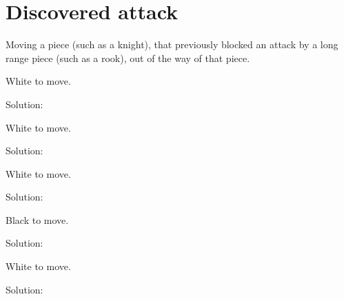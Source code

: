 \documentclass{book}
\begin{document}
\section{Discovered attack}
Moving a piece (such as a knight), that previously blocked an attack by a long range piece (such as a rook), out of the way of that piece.\begin{multicols}{2} 
\begin{samepage} 
\newgame 


 
\showboard
 
 White to move. 
 
Solution: 
 
\end{samepage}\begin{samepage} 
\newgame 


 
\showboard
 
 White to move. 
 
Solution: 
 
\end{samepage}\begin{samepage} 
\newgame 


 
\showboard
 
 White to move. 
 
Solution: 
 
\end{samepage}\begin{samepage} 
\newgame 


 
\showboard
 
 Black to move. 
 
Solution: 
 
\end{samepage}\begin{samepage} 
\newgame 


 
\showboard
 
 White to move. 
 
Solution: 
 
\end{samepage}\end{multicols} 
\newpage 
\end{document}
